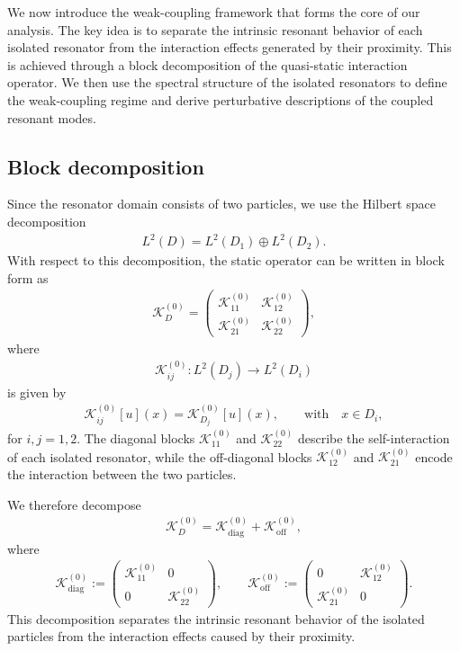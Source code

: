 \documentclass[10pt]{article}
\numberwithin{equation}{section}
\begin{document}
We now introduce the weak-coupling framework that forms the core of our analysis. The key idea is to separate the intrinsic resonant behavior of each isolated resonator from the interaction effects generated by their proximity. This is achieved through a block decomposition of the quasi-static interaction operator. We then use the spectral structure of the isolated resonators to define the weak-coupling regime and derive perturbative descriptions of the coupled resonant modes.





\subsection{Block decomposition}

Since the resonator domain consists of two particles, we use the Hilbert space decomposition
\begin{align*}
    L^2(D) = L^2(D_1)\oplus L^2(D_2).
\end{align*}
With respect to this decomposition, the static operator can be written in block form as
\begin{align}\label{eq:blockdecomp_3D}
    \mathcal K_D^{(0)} =
    \begin{pmatrix}
        \mathcal K_{11}^{(0)} & \mathcal K_{12}^{(0)}\\
        \mathcal K_{21}^{(0)} & \mathcal K_{22}^{(0)}
    \end{pmatrix},
\end{align}
where
\begin{align*}
    \mathcal K_{ij}^{(0)}:L^2(D_j)\to L^2(D_i)
\end{align*}
is given by
\begin{align}
    \mathcal K_{ij}^{(0)}[u](x) = \mathcal K_{D_j}^{(0)}[u](x), \qquad \text{with} \quad x\in D_i,
\end{align}
for $i,j=1,2$. The diagonal blocks $\mathcal K_{11}^{(0)}$ and $\mathcal K_{22}^{(0)}$ describe the self-interaction of each isolated resonator, while the off-diagonal blocks $\mathcal K_{12}^{(0)}$ and $\mathcal K_{21}^{(0)}$ encode the interaction between the two particles.

We therefore decompose
\begin{align}\label{eq:diagoff_3D}
    \mathcal K_D^{(0)} = \mathcal K_{\mathrm{diag}}^{(0)} + \mathcal K_{\mathrm{off}}^{(0)},
\end{align}
where
\begin{align}
    \mathcal K_{\mathrm{diag}}^{(0)} :=
    \begin{pmatrix}
        \mathcal K_{11}^{(0)} & 0\\
        0 & \mathcal K_{22}^{(0)}
    \end{pmatrix},
    \qquad
    \mathcal K_{\mathrm{off}}^{(0)} :=
    \begin{pmatrix}
        0 & \mathcal K_{12}^{(0)}\\
        \mathcal K_{21}^{(0)} & 0
    \end{pmatrix}.
\end{align}
This decomposition separates the intrinsic resonant behavior of the isolated particles from the interaction effects caused by their proximity.
\end{document}

